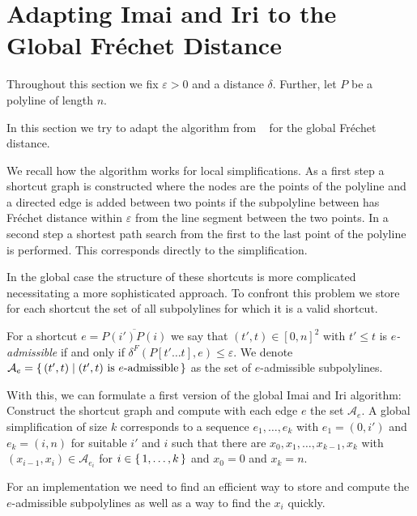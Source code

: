 \section{Adapting Imai and Iri to the Global Fréchet Distance}
\label{sec:global_imai_iri}

Throughout this section we fix \(\varepsilon > 0\) and a distance \(\delta\). Further, let \(P\) be a polyline of length \(n\).

In this section we try to adapt the algorithm from \citeauthor{computational_geometric_methods_for_polygonal_approximations_of_a_curve}~\cite{computational_geometric_methods_for_polygonal_approximations_of_a_curve} for the global Fréchet distance. 

We recall how the algorithm works for local simplifications. As a first step a shortcut graph is constructed where the nodes are the points of the polyline and a directed edge is added between two points if the subpolyline between has Fréchet distance within \(\varepsilon\) from the line segment between the two points. In a second step a shortest path search from the first to the last point of the polyline is performed. This corresponds directly to the simplification.

In the global case the structure of these shortcuts is more complicated necessitating a more sophisticated approach. To confront this problem we store for each shortcut the set of all subpolylines for which it is a valid shortcut. 

\begin{definition}
  For a shortcut \(e = \overline{P(i')P(i)}\) we say that \((t', t) \in [0, n]^2\) with \(t' \leq t\) is \emph{\(e\)-admissible} if and only if \(\delta^F(P[t' \dots t], e) \leq \varepsilon\). We denote \(\mathcal{A}_e = \set{(t', t) \mid (t', t) \textrm{ is } e\textrm{-admissible}}\) as the set of \(e\)-admissible subpolylines.
\end{definition}

With this, we can formulate a first version of the global Imai and Iri algorithm: Construct the shortcut graph and compute with each edge \(e\) the set \(\mathcal{A}_e\). A global simplification of size \(k\) corresponds to a sequence \(e_1, \dots, e_k\) with \(e_1 = (0, i')\) and \(e_k = (i, n)\) for suitable \(i'\) and \(i\) such that there are \(x_0, x_1, \dots, x_{k-1}, x_k\) with \((x_{i-1}, x_{i}) \in \mathcal{A}_{e_i}\) for \(i \in \set{1, \dots, k}\) and \(x_0 = 0\) and \(x_k = n\).

For an implementation we need to find an efficient way to store and compute the \(e\)-admissible subpolylines as well as a way to find the \(x_i\) quickly. 

